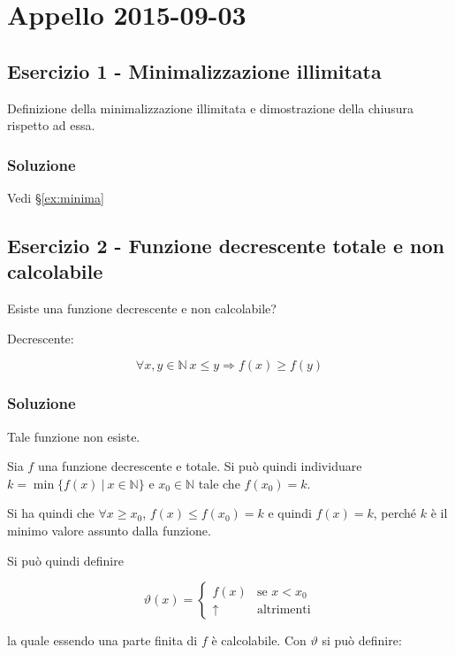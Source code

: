 \section{Appello 2015-09-03}

\subsection{Esercizio 1 - Minimalizzazione illimitata}

Definizione della minimalizzazione illimitata e dimostrazione della chiusura rispetto ad essa.

\subsubsection{Soluzione}

Vedi §\ref{ex:minima}


\subsection{Esercizio 2 - Funzione decrescente totale e non calcolabile}

Esiste una funzione decrescente e non calcolabile?

Decrescente:

$$
\forall x,y \in \mathbb{N} \: x \leq y \Rightarrow f(x) \geq f(y) 
$$

\subsubsection{Soluzione}

Tale funzione non esiste.

Sia $f$ una funzione decrescente e totale. Si può quindi individuare $k =  \min	\{ f(x) \: | \: x \in \mathbb{N} \}$ e $x_0 \in \mathbb{N} $ tale che $f(x_0) = k$.

Si ha quindi che $\forall x \geq x_0$, $f(x) \leq f(x_0) = k $ e quindi $f(x) = k$, perché $k$ è il minimo valore assunto dalla funzione.

Si può quindi definire

$$
\vartheta(x) = \begin{cases}
f(x) &\text{se } x < x_0 \\
\uparrow &\text{altrimenti}
\end{cases}
$$

la quale essendo una parte finita di $f$ è calcolabile.
Con $\vartheta$ si può definire:

